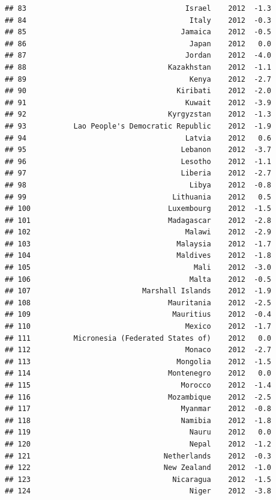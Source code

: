 \documentclass[
]{book}
\begin{document}
\begin{verbatim}
## 83                                     Israel    2012  -1.3
## 84                                      Italy    2012  -0.3
## 85                                    Jamaica    2012  -0.5
## 86                                      Japan    2012   0.0
## 87                                     Jordan    2012  -4.0
## 88                                 Kazakhstan    2012  -1.1
## 89                                      Kenya    2012  -2.7
## 90                                   Kiribati    2012  -2.0
## 91                                     Kuwait    2012  -3.9
## 92                                 Kyrgyzstan    2012  -1.3
## 93           Lao People's Democratic Republic    2012  -1.9
## 94                                     Latvia    2012   0.6
## 95                                    Lebanon    2012  -3.7
## 96                                    Lesotho    2012  -1.1
## 97                                    Liberia    2012  -2.7
## 98                                      Libya    2012  -0.8
## 99                                  Lithuania    2012   0.5
## 100                                Luxembourg    2012  -1.5
## 101                                Madagascar    2012  -2.8
## 102                                    Malawi    2012  -2.9
## 103                                  Malaysia    2012  -1.7
## 104                                  Maldives    2012  -1.8
## 105                                      Mali    2012  -3.0
## 106                                     Malta    2012  -0.5
## 107                          Marshall Islands    2012  -1.9
## 108                                Mauritania    2012  -2.5
## 109                                 Mauritius    2012  -0.4
## 110                                    Mexico    2012  -1.7
## 111          Micronesia (Federated States of)    2012   0.0
## 112                                    Monaco    2012  -2.7
## 113                                  Mongolia    2012  -1.5
## 114                                Montenegro    2012   0.0
## 115                                   Morocco    2012  -1.4
## 116                                Mozambique    2012  -2.5
## 117                                   Myanmar    2012  -0.8
## 118                                   Namibia    2012  -1.8
## 119                                     Nauru    2012   0.0
## 120                                     Nepal    2012  -1.2
## 121                               Netherlands    2012  -0.3
## 122                               New Zealand    2012  -1.0
## 123                                 Nicaragua    2012  -1.5
## 124                                     Niger    2012  -3.8

\end{verbatim}
\end{document}
